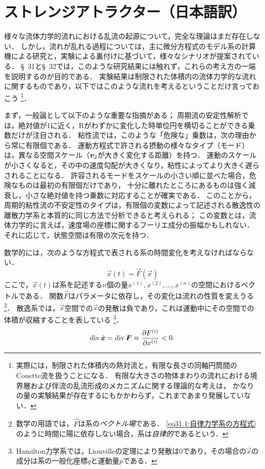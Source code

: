 \section{\spade ストレンジアトラクター（日本語訳）}
\label{sec:31}
様々な流体力学的流れにおける乱流の起源について，完全な理論はまだ存在しない．
しかし，流れが乱れる過程については，主に微分方程式のモデル系の計算機による研究と，実験による裏付けに基づいて，様々なシナリオが提案されている．
\S~31と\S~32では，このような研究結果には触れず，これらの考え方の一端を説明するのが目的である．
実験結果は制限された体積内の流体力学的な流れに関するものであり，以下ではこのような流れを考えるということだけ言っておこう
\footnote{実際には，制限された体積内の熱対流と，有限な長さの同軸円筒間のCouette流を扱うことになる．
有限な大きさの物体まわりの流れにおける境界層および伴流の乱流形成のメカニズムに関する理論的な考えは，
かなりの量の実験結果が存在するにもかかわらず，これまであまり発展していない．}．



まず，一般論として以下のような重要な指摘がある；
周期流の安定性解析では，絶対値が1に近く，Rがわずかに変化した時単位円を横切ることができる乗数だけが注目される．
粘性流では，このような「危険な」乗数は，次の理由から常に有限個である．
運動方程式で許される摂動の様々なタイプ（モード）は，異なる空間スケール（$\vb*{v}_2$が大きく変化する距離）を持つ．
運動のスケールが小さくなると，その中の速度勾配が大きくなり，粘性によってより大きく遅らされることになる．
許容されるモードをスケールの小さい順に並べた場合，危険なものは最初の有限個だけであり，
十分に離れたところにあるものは強く減衰し，小さな絶対値を持つ乗数に対応することが確実である．
このことから，周期的粘性流の不安定性のタイプは，有限個の変数によって記述される散逸性の離散力学系と本質的に同じ方法で分析できると考えられる；
この変数とは，流体力学的に言えば，速度場の座標に関するフーリエ成分の振幅かもしれない．
それに応じて，状態空間は有限の次元を持つ．




数学的には，次のような方程式で表される系の時間変化を考えなければならない．
\begin{equation}\label{eq31.1:自律力学系の方程式}
    \dot{\vec{x}}(t) = \vec{F}(\vec{x})
\end{equation}
ここで，$\vec{x}(t)$は系を記述する$n$個の量$x^{(1)},x^{(2)}, \ldots , x^{(n)}$の空間におけるベクトルである．
関数$\vec{F}$はパラメータに依存し，その変化は流れの性質を変えうる
\footnote{数学の用語では，$\vec{F}$は系の\emph{ベクトル場}である．
\eqref{eq31.1:自律力学系の方程式}のように時間に陽に依存しない場合，系は\emph{自律的}であるという．}．
散逸系では，$\vec{x}$空間での$\dot{\vec{x}}$の発散は負であり，これは運動中にその空間での体積が収縮することを表している
\footnote{Hamilton力学系では，Liouvilleの定理により発散は0であり，その場合の$\vec{x}$の成分は系の一般化座標$q$と運動量$p$である．}．
\begin{equation}
    \operatorname{div}\dot{\vb*{x}} = \operatorname{div}\vb*{F} \equiv \pdv{F^{(i)}}{x^{(i)}} < 0.
\end{equation}



